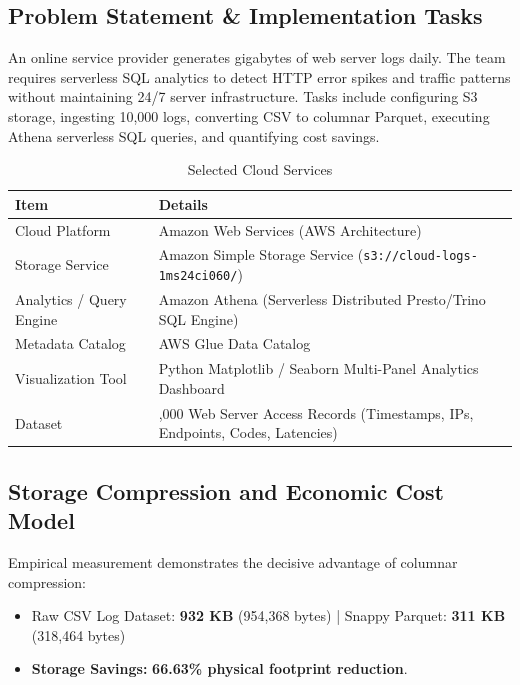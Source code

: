 \documentclass[12pt,a4paper]{report}
\begin{document}
\subsection{Problem Statement \& Implementation Tasks}
An online service provider generates gigabytes of web server logs daily. The team requires serverless SQL analytics to detect HTTP error spikes and traffic patterns without maintaining 24/7 server infrastructure. Tasks include configuring S3 storage, ingesting 10,000 logs, converting CSV to columnar Parquet, executing Athena serverless SQL queries, and quantifying cost savings.

\begin{table}[H]
\centering
\small
\caption{Selected Cloud Services}
\label{tab:cloud_services}
\begin{tabularx}{\textwidth}{|>{\raggedright\arraybackslash}p{4.2cm}|>{\raggedright\arraybackslash}X|}
\hline
\textbf{Item} & \textbf{Details}\\
\hline
Cloud Platform & Amazon Web Services (AWS Architecture)\\
\hline
Storage Service & Amazon Simple Storage Service (\texttt{s3://cloud-logs-1ms24ci060/})\\
\hline
Analytics / Query Engine & Amazon Athena (Serverless Distributed Presto/Trino SQL Engine)\\
\hline
Metadata Catalog & AWS Glue Data Catalog\\
\hline
Visualization Tool & Python Matplotlib / Seaborn Multi-Panel Analytics Dashboard\\
\hline
Dataset & 10,000 Web Server Access Records (Timestamps, IPs, Endpoints, Codes, Latencies)\\
\hline
\end{tabularx}
\end{table}

\subsection{Storage Compression and Economic Cost Model}
Empirical measurement demonstrates the decisive advantage of columnar compression:
\begin{itemize}
    \item Raw CSV Log Dataset: \textbf{932 KB} (954,368 bytes) | Snappy Parquet: \textbf{311 KB} (318,464 bytes)
    \item \textbf{Storage Savings:} \textbf{66.63\% physical footprint reduction}.
\end{itemize}
\end{document}
